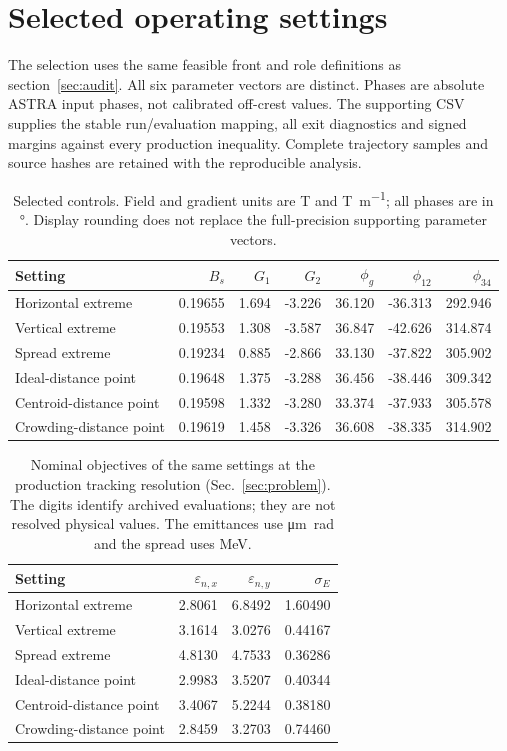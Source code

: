 \section{Selected operating settings}
\label{app:settings}
The selection uses the same feasible front and role definitions as section~\ref{sec:audit}.
All six parameter vectors are distinct. Phases are absolute ASTRA input phases, not
calibrated off-crest values. The supporting CSV supplies the stable run/evaluation mapping,
all exit diagnostics and signed margins against every production inequality. Complete
trajectory samples and source hashes are retained with the reproducible analysis.

\begin{table}[htbp]
\centering\small
\caption{Selected controls. Field and gradient units are \si{\tesla} and
\si{\tesla\per\metre}; all phases are in \si{\degree}. Display rounding does not
replace the full-precision supporting parameter vectors.}
\label{tab:selected_controls}
\begin{tabular}{lrrrrrr}\toprule
Setting & $B_s$ & $G_1$ & $G_2$ & $\phi_g$ & $\phi_{12}$ & $\phi_{34}$ \\\midrule
Horizontal extreme & 0.19655 & 1.694 & -3.226 & 36.120 & -36.313 & 292.946 \\
Vertical extreme & 0.19553 & 1.308 & -3.587 & 36.847 & -42.626 & 314.874 \\
Spread extreme & 0.19234 & 0.885 & -2.866 & 33.130 & -37.822 & 305.902 \\
Ideal-distance point & 0.19648 & 1.375 & -3.288 & 36.456 & -38.446 & 309.342 \\
Centroid-distance point & 0.19598 & 1.332 & -3.280 & 33.374 & -37.933 & 305.578 \\
Crowding-distance point & 0.19619 & 1.458 & -3.326 & 36.608 & -38.335 & 314.902 \\
\bottomrule\end{tabular}\end{table}
\begin{table}[htbp]\centering
\caption{Nominal objectives of the same settings at the production tracking resolution
(Sec.~\ref{sec:problem}). The digits identify archived evaluations; they are not resolved
physical values. The emittances use
\si{\micro\metre\radian} and the spread uses \si{\mega\electronvolt}.}
\label{tab:selected_objectives}
\begin{tabular}{lrrr}\toprule
Setting & $\varepsilon_{n,x}$ & $\varepsilon_{n,y}$ & $\sigma_E$ \\\midrule
Horizontal extreme & 2.8061 & 6.8492 & 1.60490 \\
Vertical extreme & 3.1614 & 3.0276 & 0.44167 \\
Spread extreme & 4.8130 & 4.7533 & 0.36286 \\
Ideal-distance point & 2.9983 & 3.5207 & 0.40344 \\
Centroid-distance point & 3.4067 & 5.2244 & 0.38180 \\
Crowding-distance point & 2.8459 & 3.2703 & 0.74460 \\
\bottomrule\end{tabular}\end{table}
